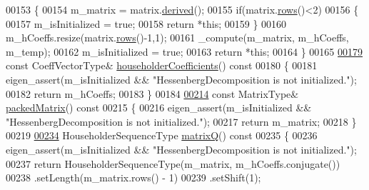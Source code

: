 \begin{DoxyCode}
00153     \{
00154       m\_matrix = matrix.\hyperlink{group___core___module_a324b16961a11d2ecfd2d1b7dd7946545}{derived}();
00155       \textcolor{keywordflow}{if}(matrix.\hyperlink{group___core___module_a8141320ba8df384426c298b32b000d8e}{rows}()<2)
00156       \{
00157         m\_isInitialized = \textcolor{keyword}{true};
00158         \textcolor{keywordflow}{return} *\textcolor{keyword}{this};
00159       \}
00160       m\_hCoeffs.resize(matrix.\hyperlink{group___core___module_a8141320ba8df384426c298b32b000d8e}{rows}()-1,1);
00161       \_compute(m\_matrix, m\_hCoeffs, m\_temp);
00162       m\_isInitialized = \textcolor{keyword}{true};
00163       \textcolor{keywordflow}{return} *\textcolor{keyword}{this};
00164     \}
00165 
\hyperlink{group___eigenvalues___module_a65fa81ce79d956baa59a30a6d82f8a84}{00179}     \textcolor{keyword}{const} CoeffVectorType& \hyperlink{group___eigenvalues___module_a65fa81ce79d956baa59a30a6d82f8a84}{householderCoefficients}()\textcolor{keyword}{ const}
00180 \textcolor{keyword}{    }\{
00181       eigen\_assert(m\_isInitialized && \textcolor{stringliteral}{"HessenbergDecomposition is not initialized."});
00182       \textcolor{keywordflow}{return} m\_hCoeffs;
00183     \}
00184 
\hyperlink{group___eigenvalues___module_a1f72b7612fd4edc5a6f31005e433e1dd}{00214}     \textcolor{keyword}{const} MatrixType& \hyperlink{group___eigenvalues___module_a1f72b7612fd4edc5a6f31005e433e1dd}{packedMatrix}()\textcolor{keyword}{ const}
00215 \textcolor{keyword}{    }\{
00216       eigen\_assert(m\_isInitialized && \textcolor{stringliteral}{"HessenbergDecomposition is not initialized."});
00217       \textcolor{keywordflow}{return} m\_matrix;
00218     \}
00219 
\hyperlink{group___eigenvalues___module_a346441e4902a58d43d698ac3da6ff791}{00234}     HouseholderSequenceType \hyperlink{group___eigenvalues___module_a346441e4902a58d43d698ac3da6ff791}{matrixQ}()\textcolor{keyword}{ const}
00235 \textcolor{keyword}{    }\{
00236       eigen\_assert(m\_isInitialized && \textcolor{stringliteral}{"HessenbergDecomposition is not initialized."});
00237       \textcolor{keywordflow}{return} HouseholderSequenceType(m\_matrix, m\_hCoeffs.conjugate())
00238              .setLength(m\_matrix.rows() - 1)
00239              .setShift(1);

\end{DoxyCode}
